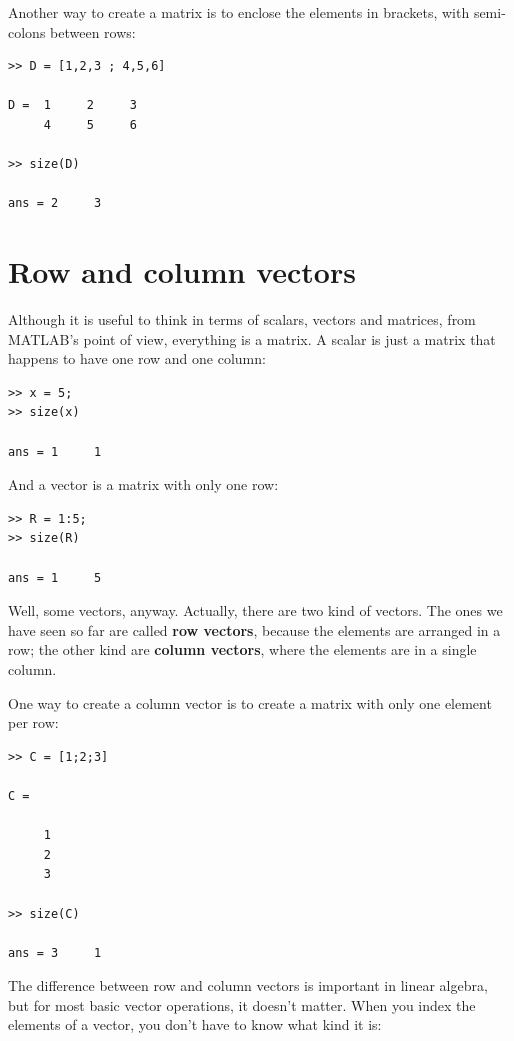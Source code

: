 \documentclass[
]{book}
\begin{document}
Another way to create a matrix is to enclose the elements in
brackets, with semi-colons between rows:

\begin{verbatim}
>> D = [1,2,3 ; 4,5,6]

D =  1     2     3
     4     5     6

>> size(D)

ans = 2     3
\end{verbatim}


\section{Row and column vectors}

Although it is useful to think in terms of scalars, vectors and matrices,
from MATLAB's point of view, everything is a matrix.  A scalar
is just a matrix that happens to have one row and one column:

\begin{verbatim}
>> x = 5;
>> size(x)

ans = 1     1
\end{verbatim}

And a vector is a matrix with only one row:

\begin{verbatim}
>> R = 1:5;
>> size(R)

ans = 1     5
\end{verbatim}

Well, some vectors, anyway.  Actually, there are two kind
of vectors.  The ones we have seen so far are called {\bf row vectors},
because the elements are arranged in a row; the other kind are
{\bf column vectors}, where the elements are in a single column.

One way to create a column vector is to create a matrix with only
one element per row:

\begin{verbatim}
>> C = [1;2;3]

C =

     1
     2
     3

>> size(C)

ans = 3     1
\end{verbatim}

The difference between row and column vectors is important in
linear algebra, but for
most basic vector operations, it doesn't matter.  When you
index the elements of a vector, you don't have to know what kind
it is:
\end{document}
